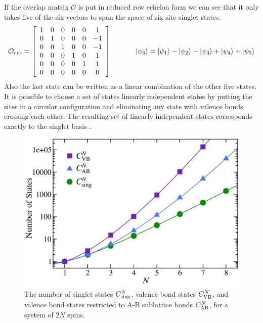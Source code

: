 \noindent If the overlap matrix $\mathcal{O}$ is put in reduced row echelon form we can see that it only takes five of the six vectors to span the space of six site singlet states.  
\begin{equation}
 \mathcal{O}_{rre} =
 \left[\begin{array}{cccccc}
		1&0&0&0&0&1\\
		0&1&0&0&0&-1\\
		0&0&1&0&0&-1\\
		0&0&0&1&0&1\\
		0&0&0&0&1&1\\
		0&0&0&0&0&0
		\end{array}\right] \hspace{1.2cm}
		\lvert {\psi_6} \rangle = \lvert {\psi_1} \rangle -\lvert {\psi_2} \rangle -\lvert {\psi_3} \rangle +\lvert {\psi_4} \rangle + \lvert {\psi_5} \rangle
\end{equation}
Also the last state can be written as a linear combination of the other five states.
It is possible to choose a set of states linearly independent states by putting the sites in a circular configuration and eliminating any state with valence bonds crossing each other.  
The resulting set of linearly independent states corresponds exactly to the singlet basis \cite{Beach2006}.
\begin{figure} {  
\centering
\includegraphics [width=4.5in]{./figures/made/fact.pdf} 
\caption[Comparison of numbers of singlet and valence bond states]{
The number of singlet states $C^N_{\rm sing}$, valence bond states $C^N_{\rm VB}$, and valence bond states restricted to A-B sublattice bonds $C^N_{\rm AB}$, for a system of $2N$ spins.}
 \label{statess}
 }
\end{figure}

%
%


